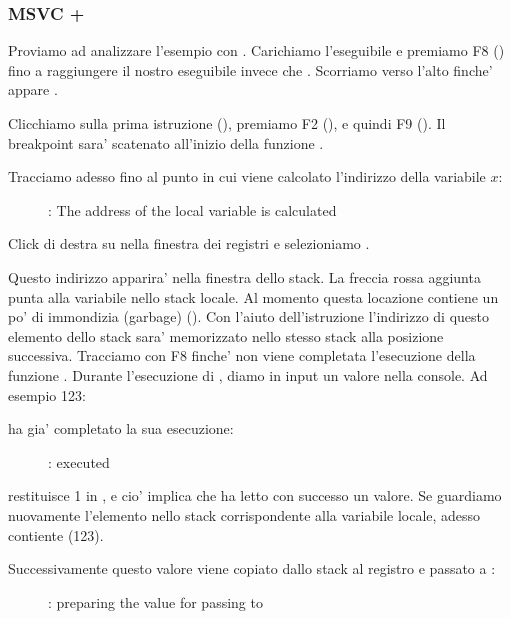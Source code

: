 \clearpage
\subsubsection{MSVC + \olly}
\myindex{\olly}

Proviamo ad analizzare l'esempio con \olly.
Carichiamo l'eseguibile e premiamo F8 (\stepover) fino a raggiungere il nostro eseguibile invece che .
Scorriamo verso l'alto finche' appare \main .

Clicchiamo sulla prima istruzione (), premiamo F2 (), e quindi F9 ().
Il breakpoint sara' scatenato all'inizio della funzione \main .

Tracciamo adesso fino al punto in cui viene calcolato l'indirizzo della variabile $x$:

\begin{figure}[H]
\centering
{}
\caption{\olly: The address of the local variable is calculated}
\label{fig:scanf_ex1_olly_1}
\end{figure}


Click di destra su \EAX nella finestra dei registri e selezioniamo .

Questo indirizzo apparira' nella finestra dello stack.
La freccia rossa aggiunta punta alla variabile nello stack locale.
Al momento questa locazione contiene un po' di immondizia (garbage) ().
Con l'aiuto dell'istruzione \PUSH l'indirizzo di questo elemento dello stack sara' memorizzato nello stesso stack alla posizione successiva.
Tracciamo con F8 finche' non viene completata l'esecuzione della funzione \scanf.
Durante l'esecuzione di \scanf, diamo in input un valore nella console. Ad esempio 123:



\clearpage
\scanf ha gia' completato la sua esecuzione:

\begin{figure}[H]
\centering
{}
\caption{\olly: \scanf executed}
\label{fig:scanf_ex1_olly_3}
\end{figure}

\scanf restituisce 1 in \EAX, e cio' implica che ha letto con successo un valore.
Se guardiamo nuovamente l'elemento nello stack corrispondente alla variabile locale, adesso contiente  (123).

\clearpage

Successivamente questo valore viene copiato dallo stack al registro \ECX e passato a \printf:

\begin{figure}[H]
\centering
{}
\caption{\olly: preparing the value for passing to \printf}
\label{fig:scanf_ex1_olly_4}
\end{figure}
